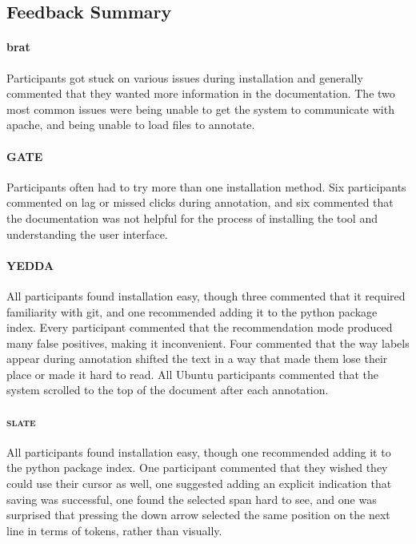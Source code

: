 \documentclass[11pt,a4paper]{article}
\newcommand\slate{\textsc{slate}\xspace}
\begin{document}
\subsection{Feedback Summary}

\paragraph{brat}
Participants got stuck on various issues during installation and generally commented that they wanted more information in the documentation.
The two most common issues were being unable to get the system to communicate with apache, and being unable to load files to annotate.

\paragraph{GATE}
Participants often had to try more than one installation method.
Six participants commented on lag or missed clicks during annotation, and six commented that the documentation was not helpful for the process of installing the tool and understanding the user interface.

\paragraph{YEDDA}
All participants found installation easy, though three commented that it required familiarity with git, and one recommended adding it to the python package index.
Every participant commented that the recommendation mode produced many false positives, making it inconvenient.
Four commented that the way labels appear during annotation shifted the text in a way that made them lose their place or made it hard to read.
All Ubuntu participants commented that the system scrolled to the top of the document after each annotation.

\paragraph{\slate}
All participants found installation easy, though one recommended adding it to the python package index.
One participant commented that they wished they could use their cursor as well, one suggested adding an explicit indication that saving was successful, one found the selected span hard to see, and one was surprised that pressing the down arrow selected the same position on the next line in terms of tokens, rather than visually.
\end{document}
